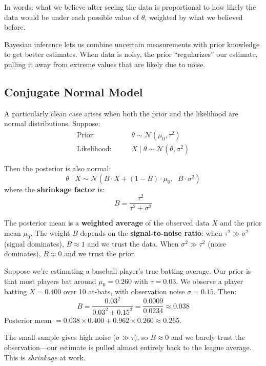 \documentclass[11pt,letterpaper]{article}
\theoremstyle{definition}
\begin{document}
In words: what we believe after seeing the data is proportional to how likely the data would be under each possible value of $\theta$, weighted by what we believed before.

\begin{tcolorbox}[keybox]
Bayesian inference lets us combine uncertain measurements with prior knowledge to get better estimates. When data is noisy, the prior ``regularizes'' our estimate, pulling it away from extreme values that are likely due to noise.
\end{tcolorbox}

\subsection{Conjugate Normal Model}

A particularly clean case arises when both the prior and the likelihood are normal distributions. Suppose:
\begin{align}
\text{Prior:} \qquad & \theta \sim \mathcal{N}(\mu_0, \tau^2) \label{eq:prior} \\
\text{Likelihood:} \qquad & X \mid \theta \sim \mathcal{N}(\theta, \sigma^2) \label{eq:lik}
\end{align}

Then the posterior is also normal:
\begin{equation}
\theta \mid X \sim \mathcal{N}\!\left(B \cdot X + (1 - B) \cdot \mu_0, \;\; B \cdot \sigma^2\right)
\label{eq:posterior}
\end{equation}
where the \textbf{shrinkage factor} is:
\begin{equation}
B = \frac{\tau^2}{\tau^2 + \sigma^2}
\label{eq:shrinkage}
\end{equation}

\begin{tcolorbox}[keybox]
The posterior mean is a \textbf{weighted average} of the observed data $X$ and the prior mean $\mu_0$. The weight $B$ depends on the \textbf{signal-to-noise ratio}: when $\tau^2 \gg \sigma^2$ (signal dominates), $B \approx 1$ and we trust the data. When $\sigma^2 \gg \tau^2$ (noise dominates), $B \approx 0$ and we trust the prior.
\end{tcolorbox}

\begin{tcolorbox}[exbox]
Suppose we're estimating a baseball player's true batting average. Our prior is that most players bat around $\mu_0 = 0.260$ with $\tau = 0.03$. We observe a player batting $X = 0.400$ over 10 at-bats, with observation noise $\sigma = 0.15$. Then:
\[
B = \frac{0.03^2}{0.03^2 + 0.15^2} = \frac{0.0009}{0.0234} \approx 0.038
\]
Posterior mean $= 0.038 \times 0.400 + 0.962 \times 0.260 \approx 0.265$.

The small sample gives high noise ($\sigma \gg \tau$), so $B \approx 0$ and we barely trust the observation---our estimate is pulled almost entirely back to the league average. This is \emph{shrinkage} at work.
\end{tcolorbox}
\end{document}
